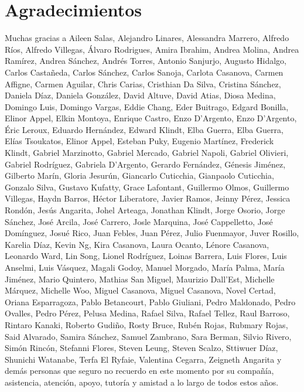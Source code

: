 \chapter*{Agradecimientos}
\vspace{-1.5cm}
Muchas gracias a Aileen Salas, Alejandro Linares, Alessandra Marrero, Alfredo Ríos, Alfredo Villegas, Álvaro Rodrigues, Amira Ibrahim, Andrea Molina, Andrea Ramírez, Andrea Sánchez, Andrés Torres, Antonio Sanjurjo, Augusto Hidalgo, Carlos Castañeda, Carlos Sánchez, Carlos Sanoja, Carlota Casanova, Carmen Affigne, Carmen Aguilar, Chris Carias, Cristhian Da Silva, Cristina Sánchez, Daniela Díaz, Daniela González, David Altuve, David Atias, Diosa Medina, Domingo Luis, Domingo Vargas, Eddie Chang, Eder Buitrago, Edgard Bonilla, Elinor Appel, Elkin Montoya, Enrique Castro, Enzo D'Argento, Enzo D'Argento, Éric Leroux, Eduardo Hernández, Edward Klindt, Elba Guerra, Elba Guerra, Elías Tsoukatos, Elinor Appel, Esteban Puky, Eugenio Martínez, Frederick Klindt, Gabriel Marzinotto, Gabriel Mercado, Gabriel Napoli, Gabriel Olivieri, Gabriel Rodríguez, Gabriela D'Argento, Gerardo Fernández, Génesis Jiménez, Gilberto Marín, Gloria Jesurún, Giancarlo Cuticchia, Gianpaolo Cuticchia, Gonzalo Silva, Gustavo Kufatty, Grace Lafontant, Guillermo Olmos, Guillermo Villegas, Haydn Barros, Héctor Liberatore, Javier Ramos, Jeinny Pérez, Jessica Rondón, Jesús Angarita, Johel Arteaga, Jonathan Klindt, Jorge Osorio, Jorge Sánchez, José Arcila, José Carrero, Josle Marquina, José Cappelletto, José Domínguez, Josué Rico, Juan Febles, Juan Pérez, Julio Fuenmayor, Juver Rosillo, Karelia Díaz, Kevin Ng, Kira Casanova, Laura Ocanto, Lénore Casanova, Leonardo Ward, Lin Song, Lionel Rodríguez, Loinas Barrera, Luis Flores, Luis Anselmi, Luis Vásquez, Magali Godoy, Manuel Morgado, María Palma, María Jiménez, Mario Quintero, Mathias San Miguel, Maurizio Dall'Est, Michelle Márquez, Michelle Woo, Miguel Casanova, Miguel Casanova, Novel Certad, Oriana Esparragoza, Pablo Betancourt, Pablo Giuliani, Pedro Maldonado, Pedro Ovalles, Pedro Pérez, Pelusa Medina, Rafael Silva, Rafael Tellez, Raul Barroso, Rintaro Kanaki, Roberto Gudiño, Rosty Bruce, Rubén Rojas, Rubmary Rojas, Said Alvarado, Samira Sánchez, Samuel Zambrano, Sara Berman, Silvio Rivero, Simón Rincón, Stefanni Flores, Steven Leung, Steven Scalzo, Sttiwuer Díaz, Shunichi Watanabe, Terfa El Ryfaie, Valentina Cegarra, Zeigneth Angarita y demás personas que seguro no recuerdo en este momento por su compañía, asistencia, atención, apoyo, tutoría y amistad a lo largo de todos estos años.
